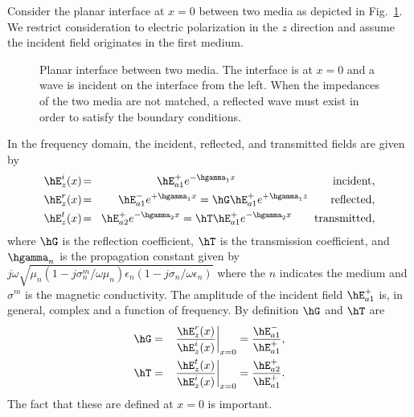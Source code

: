 Consider the planar interface at $x=0$ between two media as
depicted in Fig.\ \ref{fig:planarInterface}.  We restrict
consideration to electric polarization in the $z$ direction and assume
the incident field originates in the first medium.
\begin{figure}
  \begin{center}
  \vspace{1.5in} %
  \end{center}
  \caption{Planar interface between two media.  The interface is at
 $x=0$ and a wave is incident on the interface from the left.  When the
 impedances of the two media are not matched, a reflected wave must
 exist in order to satisfy the boundary conditions.}
  \label{fig:planarInterface}
\end{figure}
In the frequency domain, the incident, reflected, and transmitted
fields are given by
\begin{eqnarray}
  \hE_z^i(x) \!&=&\! \hE_{a1}^+ e^{-\hgamma_1 x} 
    \qquad \mbox{\hspace{.92in}incident},\\
  \hE_z^r(x) \!&=&\! \hE_{a1}^- e^{+\hgamma_1 x} =
                   \hG \hE_{a1}^+ e^{+\hgamma_1 z} \qquad \mbox{reflected},\\
  \hE_z^t(x) \!&=&\! \hE_{a2}^+ e^{-\hgamma_2 x} =
                   \hT \hE_{a1}^+ e^{-\hgamma_2 x} \qquad \mbox{transmitted},
\end{eqnarray}
where $\hG$ is the reflection coefficient, $\hT$ is the transmission
coefficient, and $\hgamma_n$ is the propagation constant given by
$j\omega\sqrt{\mu_n(1-j\sigma^m_n/\omega\mu_n)
  \epsilon_n(1-j\sigma_n/\omega\epsilon_n)}$ where the $n$ indicates
the medium and $\sigma^m$ is the magnetic conductivity.  The amplitude
of the incident field $\hE_{a1}^+$ is, in general, complex and a
function of frequency.  By definition $\hG$ and $\hT$ are
\begin{eqnarray}
  \hG &=& \left.\frac{\hE_z^r(x)}{\hE_z^i(x)}\right|_{x=0} =
              \frac{\hE_{a1}^-}{\hE_{a1}^+}, \\
       \hT &=& \left.\frac{\hE_z^t(x)}{\hE_z^i(x)}\right|_{x=0} = 
              \frac{\hE_{a2}^+}{\hE_{a1}^+}.
\end{eqnarray}
The fact that these are defined at $x=0$ is important.

